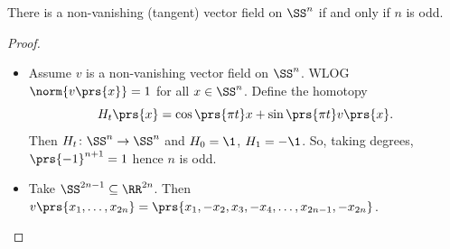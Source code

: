 \documentclass[10pt,a4paper,twoside,openany,hidelinks]{book}
\begin{document}
\begin{theorem}
There is a non-vanishing (tangent) vector field on $\SS^n$ if and only if $n$ is odd.
\end{theorem}
\begin{proof}
\begin{itemize}
\item Assume $v$ is a non-vanishing vector field on $\SS^n$. WLOG $\norm{v\prs{x}} = 1$ for all $x \in \SS^n$.
Define the homotopy
\[H_t\prs{x} = \cos\prs{\pi t}x + \sin\prs{\pi t} v\prs{x} \text{.}\]
Then $H_t \colon \SS^n \to \SS^n$ and $H_0 = \1$, $H_1 = -\1$. So, taking degrees, $\prs{-1}^{n+1} = 1$ hence $n$ is odd.
\item Take $\SS^{2n - 1} \subseteq \RR^{2n}$. Then
$v\prs{x_1, \ldots, x_{2n}} = \prs{x_1, -x_2, x_3, -x_4, \ldots, x_{2n-1}, -x_{2n}}$.
\end{itemize}
\end{proof}

\backmatter
\end{document}
